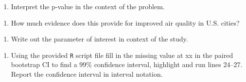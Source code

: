 \documentclass[
]{report}
\newenvironment{Shaded}{\begin{snugshade}}{\end{snugshade}}
\newcommand{\CommentTok}[1]{\textcolor[rgb]{0.56,0.35,0.01}{\textit{#1}}}
\newcommand{\DataTypeTok}[1]{\textcolor[rgb]{0.13,0.29,0.53}{#1}}
\newcommand{\DecValTok}[1]{\textcolor[rgb]{0.00,0.00,0.81}{#1}}
\newcommand{\KeywordTok}[1]{\textcolor[rgb]{0.13,0.29,0.53}{\textbf{#1}}}
\newcommand{\NormalTok}[1]{#1}
\newcommand{\OperatorTok}[1]{\textcolor[rgb]{0.81,0.36,0.00}{\textbf{#1}}}
\providecommand{\tightlist}{%
  \setlength{\itemsep}{0pt}\setlength{\parskip}{0pt}}
\begin{document}
\vspace{.3in}

\begin{enumerate}
\def\labelenumi{\arabic{enumi}.}
\setcounter{enumi}{16}
\tightlist
\item
  Interpret the p-value in the context of the problem.
\end{enumerate}

\vspace{.8in}

\begin{enumerate}
\def\labelenumi{\arabic{enumi}.}
\setcounter{enumi}{17}
\tightlist
\item
  How much evidence does this provide for improved air quality in U.S. cities?
\end{enumerate}

\vspace{.3in}

\begin{enumerate}
\def\labelenumi{\arabic{enumi}.}
\setcounter{enumi}{18}
\tightlist
\item
  Write out the parameter of interest in context of the study.
\end{enumerate}

\vspace{.6in}

\begin{enumerate}
\def\labelenumi{\arabic{enumi}.}
\setcounter{enumi}{19}
\tightlist
\item
  Using the provided \texttt{R} script file fill in the missing value at xx in the paired bootstrap CI to find a 99\% confidence interval, highlight and run lines 24--27. Report the confidence interval in interval notation.
\end{enumerate}

\begin{Shaded}
\end{Shaded}
\end{document}
